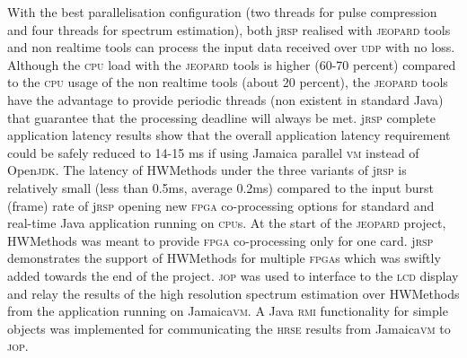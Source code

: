 \documentclass{sig-alternate}
\newcommand{\acronym}[1]{\textsc{#1}}
\begin{document}
With the best parallelisation configuration (two threads for pulse compression and four threads for spectrum estimation), both j\acronym{rsp} realised  
with \acronym{jeopard} tools and non realtime tools can process the input data received over \acronym{udp} with no loss. Although the \acronym{cpu}
load with the \acronym{jeopard} tools is higher (60-70 percent) compared to the \acronym{cpu} usage of
the non realtime tools (about 20 percent), the \acronym{jeopard} tools have the advantage to provide periodic 
threads (non existent in standard Java) that guarantee that the processing deadline
will always be met. j\acronym{rsp} complete application latency results show that the overall
application latency requirement could be safely reduced to 14-15 ms if using Jamaica parallel \acronym{vm} instead of Open\acronym{jdk}. The latency of HWMethods under the three variants of j\acronym{rsp} is relatively small (less than 0.5ms, average 0.2ms) compared to the input burst (frame) rate of j\acronym{rsp} opening new \acronym{fpga} co-processing options for standard and real-time Java application running on \acronym{cpu}s. At the start of the \acronym{jeopard} 
project, HWMethods was meant to provide \acronym{fpga} co-processing only for one card. 
j\acronym{rsp} demonstrates the support of HWMethods for multiple \acronym{fpga}s which was swiftly 
added towards the end of the project. \acronym{jop} was used to interface to the \acronym{lcd} display 
and relay the results of the high resolution spectrum estimation over HWMethods 
from the application running on Jamaica\acronym{vm}. A Java \acronym{rmi} functionality for simple 
objects was implemented for communicating the \acronym{hrse} 
results from Jamaica\acronym{vm} to \acronym{jop}\cite{jRmiBachelor}.
   
\end{document}
